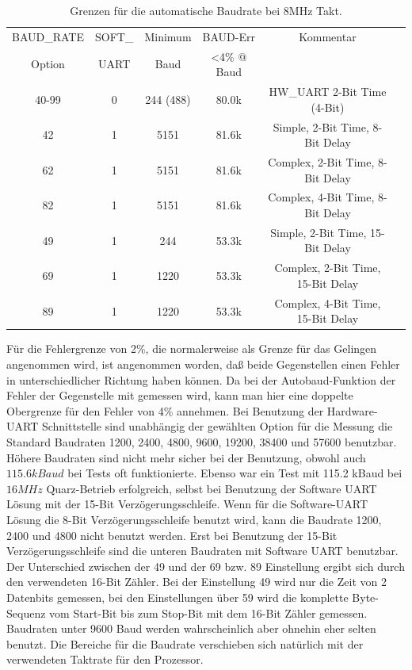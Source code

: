 \begin{table}[H]
  \begin{center}
    \begin{tabular}{| c | c | c | c | c | c |}
    \hline
   BAUD\_RATE  & SOFT\_ & Minimum & BAUD-Err & Kommentar  \\
   Option      & UART   & Baud    & \textless 4\% @ Baud &  \\
    \hline
    \hline
	    40-99      &  0     &  244 (488)  &   80.0k  & HW\_UART 2-Bit Time (4-Bit) \\
    \hline
    42         &  1     &  5151       &   81.6k  & Simple, 2-Bit Time, 8-Bit Delay  \\
    \hline
    62         &  1     &  5151       &   81.6k  & Complex, 2-Bit Time, 8-Bit Delay  \\
    \hline
    82         &  1     &  5151       &   81.6k  & Complex, 4-Bit Time, 8-Bit Delay  \\
    \hline
    49         &  1     &  244       &   53.3k  &  Simple, 2-Bit Time, 15-Bit Delay\\
    \hline
    69         &  1     &  1220       &   53.3k &  Complex, 2-Bit Time, 15-Bit Delay \\
    \hline
    89         &  1     &  1220       &   53.3k & Complex, 4-Bit Time, 15-Bit Delay \\
    \hline
    \end{tabular}
  \end{center}
  \caption{Grenzen für die automatische Baudrate bei 8MHz Takt.}
  \label{tab:AutoBaud8}
\end{table}

Für die Fehlergrenze von 2\%, die normalerweise als Grenze für das Gelingen
angenommen wird, ist angenommen worden, daß beide Gegenstellen einen Fehler
in unterschiedlicher Richtung haben können. Da bei der Autobaud-Funktion
der Fehler der Gegenstelle mit gemessen wird, kann man hier eine doppelte
Obergrenze für den Fehler von 4\% annehmen.
Bei Benutzung der Hardware-UART Schnittstelle sind unabhängig der gewählten
Option für die Messung die Standard Baudraten 1200, 2400, 4800, 9600, 19200,
38400 und 57600 benutzbar.
Höhere Baudraten sind nicht mehr sicher bei der Benutzung, obwohl
auch \(115.6kBaud\) bei Tests oft funktionierte.
Ebenso war ein Test mit 115.2 kBaud bei \(16 MHz\) Quarz-Betrieb erfolgreich,
selbst bei Benutzung der Software UART Lösung mit der 15-Bit Verzögerungsschleife.
Wenn für die Software-UART Lösung die 8-Bit Verzögerungsschleife benutzt wird,
kann die Baudrate 1200, 2400 und 4800 nicht benutzt werden.
Erst bei Benutzung der 15-Bit Verzögerungsschleife sind die unteren Baudraten
mit Software UART benutzbar.
Der Unterschied zwischen der 49 und der 69 bzw. 89 Einstellung ergibt
sich durch den verwendeten 16-Bit Zähler. Bei der Einstellung 49 wird nur
die Zeit von 2 Datenbits gemessen, bei den Einstellungen über 59 wird
die komplette Byte-Sequenz vom Start-Bit bis zum Stop-Bit mit dem 16-Bit Zähler gemessen.
Baudraten unter 9600 Baud werden wahrscheinlich aber ohnehin eher selten benutzt.
Die Bereiche für die Baudrate verschieben sich natürlich mit der verwendeten
Taktrate für den Prozessor.

